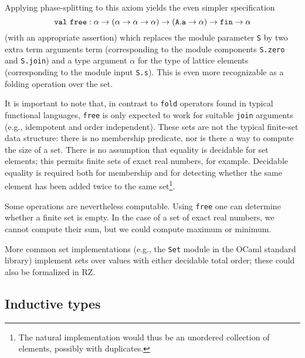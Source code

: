 Applying phase-splitting to this axiom yields the even simpler
specification
%
\begin{equation*}
\mathtt{val}\ \mathtt{free} : \alpha \to (\alpha \to \alpha \to \alpha) \to (\mathtt{A.a}\to\alpha) \to \mathtt{fin} \to \alpha	
\end{equation*}
%
(with an appropriate assertion)
which replaces the module parameter \texttt{S} by two extra term arguments term (corresponding to the module components \texttt{S.zero} and \texttt{S.join}) 
and a type argument $\alpha$ for the type of lattice elements (corresponding to the module input \texttt{S.s}).  This is even
more recognizable as a folding operation over the set.


It is important to note that, in contrast to \texttt{fold} operators found in typical functional
languages, \texttt{free} is only expected to work for suitable \texttt{join} arguments (e.g., idempotent and order independent).  These
sets are not the typical finite-set data structure: there is no membership predicate, nor
is there a way to compute the size of a set.  There is no
assumption that equality is decidable for set elements; this permits
finite sets of  exact real numbers, for example.  Decidable equality
is required both for membership and for detecting
whether the same element has been added twice to the same set\footnote{The natural implementation would thus
be an unordered collection of elements, possibly with duplicates.}.

Some operations are nevertheless computable.  Using \texttt{free} one
can determine whether a finite set is empty.  In the case of a set of exact
real numbers, we cannot compute their sum, but we could compute maximum or minimum.

More common set implementations (e.g., the \texttt{Set} module in the OCaml standard library)
implement sets over values with either decidable total order; these could also be
formalized in RZ.
\fi %

\subsection{Inductive types}
\label{sec:inductive-types}

